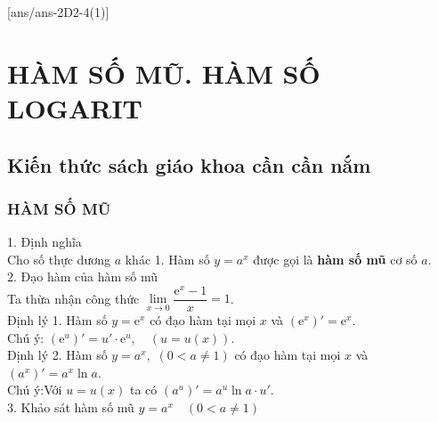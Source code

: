 [ans/ans-2D2-4(1)]
\section{HÀM SỐ MŨ. HÀM SỐ LOGARIT}
\subsection{Kiến thức sách giáo khoa cần cần nắm}
\subsubsection{HÀM SỐ MŨ}
1. Định nghĩa\\
Cho số thực dương $a$ khác 1.
Hàm số $y=a^x$ được gọi là \textbf{hàm số mũ} cơ số $a$.\\
2. Đạo hàm của hàm số mũ\\
Ta thừa nhận công thức \quad $\lim\limits_{x\to 0}\dfrac{\mathrm{e}^x-1}{x}=1$.\\
Định lý 1.
Hàm số $y=\mathrm{e}^x$ có đạo hàm tại mọi $x$ và $(\mathrm{e}^x)'=\mathrm{e}^x$.\\
Chú ý: $(\mathrm{e}^u)'=u'\cdot\mathrm{e}^u, \quad (u=u(x))$.\\
Định lý 2.
Hàm số $y=a^x,\,\,(0<a\neq 1)$ có đạo hàm tại mọi $x$ và $(a^x)'=a^x\ln a$.\\
Chú ý:\quad Với $u=u(x)$ ta có $(a^u)'=a^u \ln a\cdot u'$.\\
3. Khảo sát hàm số mũ \quad $y=a^x \quad (0<a \ne 1)$

